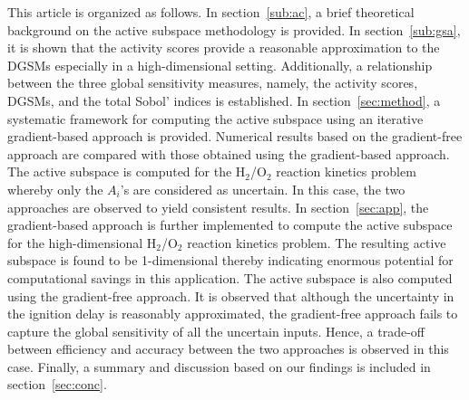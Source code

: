 This article is organized as follows. In section~\ref{sub:ac}, a brief
theoretical background on the active subspace methodology is provided. In
section~\ref{sub:gsa}, it is shown that the activity scores provide a
reasonable approximation to the DGSMs especially in a high-dimensional setting.
Additionally, a relationship between the three global sensitivity measures,
namely, the activity scores, DGSMs, and the total Sobol' indices is
established. In section~\ref{sec:method}, a systematic framework for computing
the active subspace using an iterative gradient-based approach is provided.
Numerical results based on the gradient-free approach are compared with those
obtained using the gradient-based approach.  The active subspace is computed
for the H$_2$/O$_2$ reaction kinetics problem whereby only the $A_i$'s are
considered as uncertain. In this case, the two approaches are observed to yield
consistent results. In section~\ref{sec:app}, the gradient-based approach is
further implemented to compute the active subspace for the high-dimensional
H$_2$/O$_2$ reaction kinetics problem. The resulting active subspace is found
to be 1-dimensional thereby indicating enormous potential for computational
savings in this application. The active subspace is also computed using the
gradient-free approach. It is observed that although the uncertainty in the
ignition delay is reasonably approximated, the gradient-free approach fails to
capture the global sensitivity of all the uncertain inputs. Hence, a trade-off
between efficiency and accuracy between the two approaches is observed in this
case.  Finally, a summary and discussion based on our findings is included in
section~\ref{sec:conc}.










 




